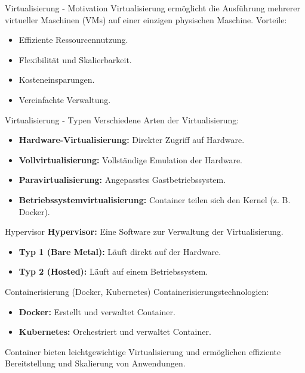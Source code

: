 \documentclass{beamer}
\begin{document}
\begin{frame}{Virtualisierung - Motivation}
    Virtualisierung ermöglicht die Ausführung mehrerer virtueller Maschinen (VMs) auf einer einzigen physischen Maschine. Vorteile:
    \begin{itemize}
        \item Effiziente Ressourcennutzung.
        \item Flexibilität und Skalierbarkeit.
        \item Kosteneinsparungen.
        \item Vereinfachte Verwaltung.
    \end{itemize}
\end{frame}

\begin{frame}{Virtualisierung - Typen}
    Verschiedene Arten der Virtualisierung:
    \begin{itemize}
        \item \textbf{Hardware-Virtualisierung:} Direkter Zugriff auf Hardware.
        \item \textbf{Vollvirtualisierung:} Vollständige Emulation der Hardware.
        \item \textbf{Paravirtualisierung:} Angepasstes Gastbetriebssystem.
        \item \textbf{Betriebssystemvirtualisierung:} Container teilen sich den Kernel (z. B. Docker).
    \end{itemize}
\end{frame}

\begin{frame}{Hypervisor}
    \textbf{Hypervisor:} Eine Software zur Verwaltung der Virtualisierung.
    \begin{itemize}
        \item \textbf{Typ 1 (Bare Metal):} Läuft direkt auf der Hardware.
        \item \textbf{Typ 2 (Hosted):} Läuft auf einem Betriebssystem.
    \end{itemize}
\end{frame}

\begin{frame}{Containerisierung (Docker, Kubernetes)}
    Containerisierungstechnologien:
    \begin{itemize}
        \item \textbf{Docker:} Erstellt und verwaltet Container.
        \item \textbf{Kubernetes:} Orchestriert und verwaltet Container.
    \end{itemize}
    Container bieten leichtgewichtige Virtualisierung und ermöglichen effiziente Bereitstellung und Skalierung von Anwendungen.
\end{frame}
\end{document}
